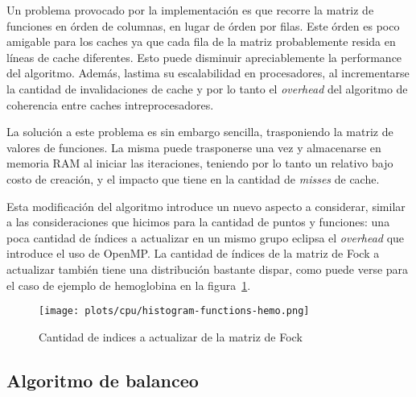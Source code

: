 Un problema provocado por la implementaci\'on es que recorre la matriz de funciones
en \'orden de columnas, en lugar de \'orden por filas. Este \'orden es poco amigable
para los caches ya que cada fila de la matriz probablemente resida en l\'ineas de
cache diferentes. Esto puede disminuir apreciablemente la performance del algoritmo.
Adem\'as, lastima su escalabilidad en procesadores, al incrementarse la cantidad de
invalidaciones de cache y por lo tanto el \textit{overhead} del algoritmo de
coherencia entre caches intreprocesadores.

La soluci\'on a este problema es sin embargo sencilla, trasponiendo la matriz de
valores de funciones. La misma puede trasponerse una vez y almacenarse en memoria
RAM al iniciar las iteraciones, teniendo por lo tanto un relativo bajo costo de
creaci\'on, y el impacto que tiene en la cantidad de \textit{misses} de cache.

Esta modificaci\'on del algoritmo introduce un nuevo aspecto a considerar, similar
a las consideraciones que hicimos para la cantidad de puntos y funciones: una poca
cantidad de \'indices a actualizar en un mismo grupo eclipsa el \textit{overhead}
que introduce el uso de OpenMP. La cantidad de \'indices de la matriz de Fock a
actualizar tambi\'en tiene una distribuci\'on bastante dispar, como puede verse
para el caso de ejemplo de hemoglobina en la figura~\ref{fig:histogram-indexes-hemo}.

\begin{figure}[htbp]
   \centering
   \texttt{[image: plots/cpu/histogram-functions-hemo.png]}
   \caption{Cantidad de indices a actualizar de la matriz de Fock}
   \label{fig:histogram-indexes-hemo}
\end{figure}

\subsection{Algoritmo de balanceo}


